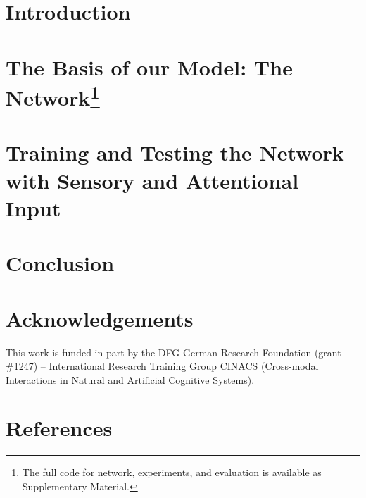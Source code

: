 \documentclass[a4paper]{elsarticle}
\begin{document}
    \section{Introduction}
        

    \section[The Basis of our Model: The Network]{The Basis of our Model: The Network\footnote{The full code for network, experiments, and evaluation is available as Supplementary Material.}}
        \label{sec:network}
        

    \section{Training and Testing the Network with Sensory and Attentional Input}
        

    \section{Conclusion}
        

    \section*{Acknowledgements}
        This work is funded in part by the DFG German Research Foundation (grant \#1247) -- International Research Training Group CINACS (Cross-modal Interactions in Natural and Artificial Cognitive Systems).   
        
    \section*{References}
	
	
\end{document}
